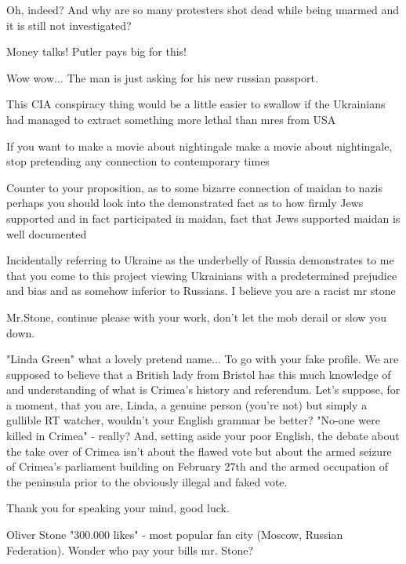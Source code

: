 \begin{itemize}
Oh, indeed? And why are so many protesters shot dead while being unarmed and it is still not investigated?

Money talks! Putler pays big for this!

Wow wow... The man is just asking for his new russian passport.

This CIA conspiracy thing would be a little easier to swallow if the Ukrainians had managed to extract something more lethal than mres from USA

If you want to make a movie about nightingale make a movie about nightingale, stop pretending any connection to contemporary times


Counter to your proposition, as to some bizarre connection of maidan to nazis
perhaps you should look into the demonstrated fact as to how firmly Jews
supported and in fact participated in maidan, fact that Jews supported maidan
is well documented



Incidentally referring to Ukraine as the underbelly of Russia demonstrates to
me that you come to this project viewing Ukrainians with a predetermined
prejudice and bias and as somehow inferior to Russians. I believe you are a
racist mr stone



Mr.Stone, continue please with your work, don't let the mob derail or slow you down.


"Linda Green" what a lovely pretend name... To go with your fake profile. We
are supposed to believe that a British lady from Bristol has this much
knowledge of and understanding of what is Crimea's history and referendum.
Let's suppose, for a moment, that you are, Linda, a genuine person (you're not)
but simply a gullible RT watcher, wouldn't your English grammar be better?
"No-one were killed in Crimea" - really? And, setting aside your poor English,
the debate about the take over of Crimea isn't about the flawed vote but about
the armed seizure of Crimea's parliament building on February 27th and the
armed occupation of the peninsula prior to the obviously illegal and faked
vote.


Thank you for speaking your mind, good luck.

Oliver Stone "300.000 likes" - most popular fan city (Moscow, Russian Federation). Wonder who pay your bills mr. Stone?


\end{itemize}
